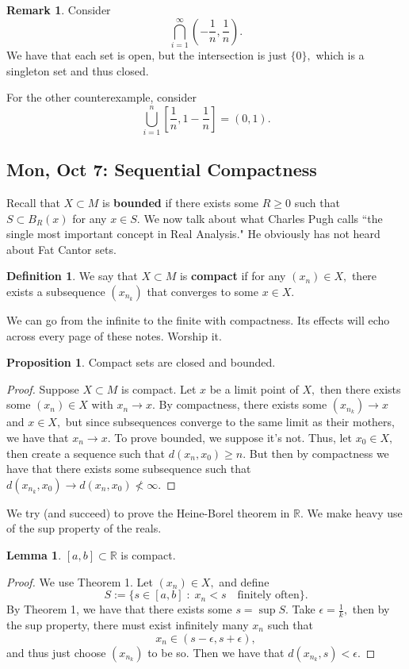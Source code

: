 \documentclass[10pt, oneside]{article}
\newcommand{\bbR}{\mathbb{R}}
\theoremstyle{definition}
\newtheorem{defn}{Definition}
\newtheorem{prop}{Proposition}
\newtheorem{rem}{Remark}
\newtheorem{lem}{Lemma}
\begin{document}
\begin{rem}
    Consider \[\bigcap_{i=1}^\infty (-\frac{1}{n}, \frac{1}{n}).\] We have that each set is open, but the intersection is just $\{0\},$ which is a singleton set and thus closed.

    For the other counterexample, consider \[\bigcup_{i=1}^n [\frac{1}{n}, 1-\frac{1}{n}] = (0,1).\]
\end{rem}

\subsection{Mon, Oct 7: Sequential Compactness}
Recall that $X \subset M$ is \textbf{bounded} if there exists some $R\geq 0$ such that $ S \subset B_R(x)$ for any $x\in S.$ We now talk about what Charles Pugh calls ``the single most important concept in Real Analysis." He obviously has not heard about Fat Cantor sets.
\begin{defn}
    We say that $X \subset M$ is \textbf{compact} if for any $(x_n) \in X,$ there exists a subsequence $(x_{n_k})$ that converges to some $x\in X.$
\end{defn}
We can go from the infinite to the finite with compactness. Its effects will echo across every page of these notes. Worship it. 
\begin{prop}
    Compact sets are closed and bounded.
\end{prop}
\begin{proof}
    Suppose $X \subset M$ is compact. Let $x$ be a limit point of $X,$ then there exists some $(x_n)\in X$ with $x_n \to x.$ By compactness, there exists some $(x_{n_k})\to x$ and $x \in X,$ but since subsequences converge to the same limit as their mothers, we have that $x_n \to x.$ To prove bounded, we suppose it's not. Thus, let $x_0 \in X,$ then create a sequence such that $d(x_n, x_0)\geq n.$ But then by compactness we have that there exists some subsequence such that $d(x_{n_k}, x_0) \to d(x_n, x_0) \not < \infty.$ 
\end{proof}
We try (and succeed) to prove the Heine-Borel theorem in $\bbR.$ We make heavy use of the sup property of the reals. 
\begin{lem}
    $[a,b]\subset \bbR$ is compact.
\end{lem}
\begin{proof}
    We use Theorem 1. Let $(x_n)\in X,$ and define 
    \[S:= \{s \in [a,b] \; : \; x_n < s \quad \text{finitely often}\}.\] By Theorem 1, we have that there exists some $s = \sup S.$ Take $\epsilon = \frac{1}{k},$ then by the sup property, there must exist infinitely many $x_n$ such that \[x_n \in (s - \epsilon, s + \epsilon),\] and thus just choose $(x_{n_k})$ to be so. Then we have that $d(x_{n_k}, s)< \epsilon.$
\end{proof}
\end{document}
